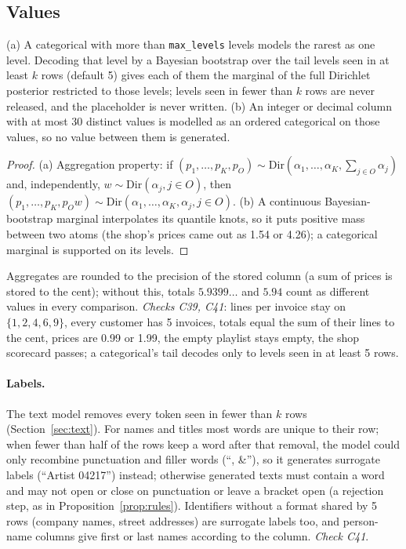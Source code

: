 \subsection{Values}
\begin{proposition}\label{prop:tail}
(a) A categorical with more than \texttt{max\_levels} levels models the rarest as one level. Decoding that level by a Bayesian bootstrap over the tail levels seen in at least $k$ rows (default 5) gives each of them the marginal of the full Dirichlet posterior restricted to those levels; levels seen in fewer than $k$ rows are never released, and the placeholder is never written. (b) An integer or decimal column with at most 30 distinct values is modelled as an ordered categorical on those values, so no value between them is generated.
\end{proposition}
\begin{proof}
(a) Aggregation property: if $(p_1,\dots,p_K,p_O)\sim\mathrm{Dir}(\alpha_1,\dots,\alpha_K,\sum_{j\in O}\alpha_j)$ and, independently, $w\sim\mathrm{Dir}(\alpha_j,j\in O)$, then $(p_1,\dots,p_K,p_Ow)\sim\mathrm{Dir}(\alpha_1,\dots,\alpha_K,\alpha_j,j\in O)$. (b) A continuous Bayesian-bootstrap marginal interpolates its quantile knots, so it puts positive mass between two atoms (the shop's prices came out as 1.54 or 4.26); a categorical marginal is supported on its levels.
\end{proof}
\noindent Aggregates are rounded to the precision of the stored column (a sum of prices is stored to the cent); without this, totals $5.9399\ldots$ and $5.94$ count as different values in every comparison. \emph{Checks C39, C41}: lines per invoice stay on $\{1,2,4,6,9\}$, every customer has 5 invoices, totals equal the sum of their lines to the cent, prices are 0.99 or 1.99, the empty playlist stays empty, the shop scorecard passes; a categorical's tail decodes only to levels seen in at least 5 rows.

\paragraph{Labels.} The text model removes every token seen in fewer than $k$ rows (Section~\ref{sec:text}). For names and titles most words are unique to their row; when fewer than half of the rows keep a word after that removal, the model could only recombine punctuation and filler words (``, \&''), so it generates surrogate labels (``Artist 04217'') instead; otherwise generated texts must contain a word and may not open or close on punctuation or leave a bracket open (a rejection step, as in Proposition~\ref{prop:rules}). Identifiers without a format shared by 5 rows (company names, street addresses) are surrogate labels too, and person-name columns give first or last names according to the column. \emph{Check C41}.

